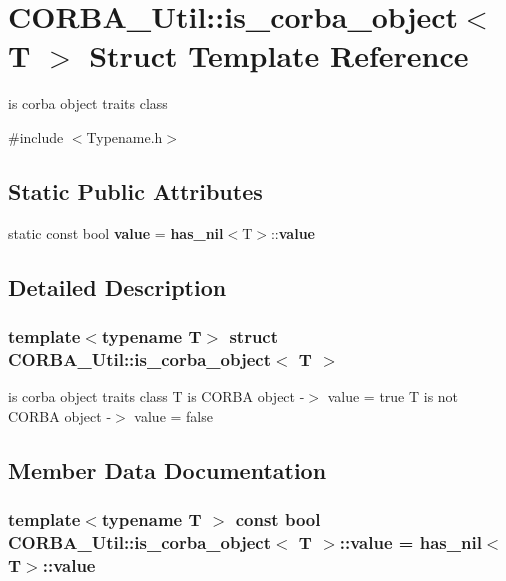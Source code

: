 \section{CORBA\_\-Util::is\_\-corba\_\-object$<$ T $>$ Struct Template Reference}
\label{structCORBA__Util_1_1is__corba__object}


is corba object traits class  




{\ttfamily \#include $<$Typename.h$>$}

\subsection*{Static Public Attributes}
\begin{DoxyCompactItemize}
\item 
static const bool {\bf value} = {\bf has\_\-nil}$<$T$>$::{\bf value}
\end{DoxyCompactItemize}


\subsection{Detailed Description}
\subsubsection*{template$<$typename T$>$ struct CORBA\_\-Util::is\_\-corba\_\-object$<$ T $>$}

is corba object traits class T is CORBA object -\/$>$ value = true T is not CORBA object -\/$>$ value = false 

\subsection{Member Data Documentation}
\subsubsection[{value}]{\setlength{\rightskip}{0pt plus 5cm}template$<$typename T $>$ const bool {\bf CORBA\_\-Util::is\_\-corba\_\-object}$<$ T $>$::{\bf value} = {\bf has\_\-nil}$<$T$>$::{\bf value}\hspace{0.3cm}{\ttfamily  [static]}}\label{structCORBA__Util_1_1is__corba__object_a1ca9ab7460b29624bb71bf2a0b3e7a24}
